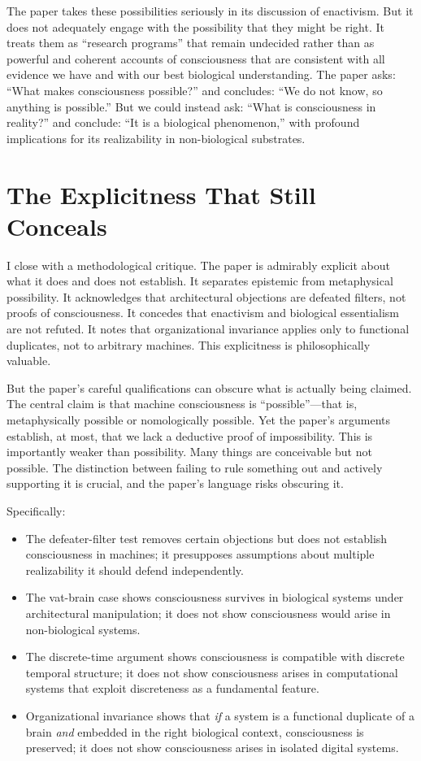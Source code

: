 \documentclass[11pt]{article}
\begin{document}
The paper takes these possibilities seriously in its discussion of enactivism. But it does not adequately engage with the possibility that they might be right. It treats them as ``research programs'' that remain undecided rather than as powerful and coherent accounts of consciousness that are consistent with all evidence we have and with our best biological understanding. The paper asks: ``What makes consciousness possible?'' and concludes: ``We do not know, so anything is possible.'' But we could instead ask: ``What is consciousness in reality?'' and conclude: ``It is a biological phenomenon,'' with profound implications for its realizability in non-biological substrates.

\section{The Explicitness That Still Conceals}

I close with a methodological critique. The paper is admirably explicit about what it does and does not establish. It separates epistemic from metaphysical possibility. It acknowledges that architectural objections are defeated filters, not proofs of consciousness. It concedes that enactivism and biological essentialism are not refuted. It notes that organizational invariance applies only to functional duplicates, not to arbitrary machines. This explicitness is philosophically valuable.

But the paper's careful qualifications can obscure what is actually being claimed. The central claim is that machine consciousness is ``possible''---that is, metaphysically possible or nomologically possible. Yet the paper's arguments establish, at most, that we lack a deductive proof of impossibility. This is importantly weaker than possibility. Many things are conceivable but not possible. The distinction between failing to rule something out and actively supporting it is crucial, and the paper's language risks obscuring it.

Specifically:

\begin{itemize}
\item The defeater-filter test removes certain objections but does not establish consciousness in machines; it presupposes assumptions about multiple realizability it should defend independently.
\item The vat-brain case shows consciousness survives in biological systems under architectural manipulation; it does not show consciousness would arise in non-biological systems.
\item The discrete-time argument shows consciousness is compatible with discrete temporal structure; it does not show consciousness arises in computational systems that exploit discreteness as a fundamental feature.
\item Organizational invariance shows that \textit{if} a system is a functional duplicate of a brain \textit{and} embedded in the right biological context, consciousness is preserved; it does not show consciousness arises in isolated digital systems.
\end{itemize}
\end{document}
